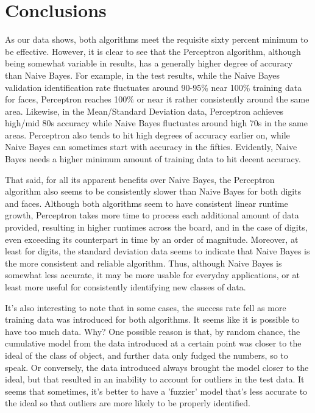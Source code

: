 \documentclass{article}
\begin{document}
\section{Conclusions}
As our data shows, both algorithms meet the requisite sixty percent minimum to be effective. However, it is clear to see that the Perceptron algorithm, although being somewhat variable in results, has a generally higher degree of accuracy than Naive Bayes. For example, in the test results, while the Naive Bayes validation identification rate fluctuates around 90-95\% near 100\% training data for faces, Perceptron reaches 100\% or near it rather consistently around the same area. Likewise, in the Mean/Standard Deviation data, Perceptron achieves high/mid 80s accuracy while Naive Bayes fluctuates around high 70s in the same areas. Perceptron also tends to hit high degrees of accuracy earlier on, while Naive Bayes can sometimes start with accuracy in the fifties. Evidently, Naive Bayes needs a higher minimum amount of training data to hit decent accuracy.
\par
That said, for all its apparent benefits over Naive Bayes, the Perceptron algorithm also seems to be consistently slower than Naive Bayes for both digits and faces. Although both algorithms seem to have consistent linear runtime growth, Perceptron takes more time to process each additional amount of data provided, resulting in higher runtimes across the board, and in the case of digits, even exceeding its counterpart in time by an order of magnitude. Moreover, at least for digits, the standard deviation data seems to indicate that Naive Bayes is the more consistent and reliable algorithm. Thus, although Naive Bayes is somewhat less accurate, it may be more usable for everyday applications, or at least more useful for consistently identifying new classes of data.
\par
It's also interesting to note that in some cases, the success rate fell as more training data was introduced for both algorithms. It seems like it is possible to have too much data. Why? One possible reason is that, by random chance, the cumulative model from the data introduced at a certain point was closer to the ideal of the class of object, and further data only fudged the numbers, so to speak. Or conversely, the data introduced always brought the model closer to the ideal, but that resulted in an inability to account for outliers in the test data. It seems that sometimes, it's better to have a 'fuzzier' model that's less accurate to the ideal so that outliers are more likely to be properly identified.
\par
\end{document}
